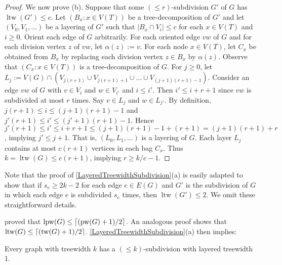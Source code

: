\documentclass[kpfonts]{patmorin}
\DeclareMathOperator{\tw}{tw}
\DeclareMathOperator{\ltw}{ltw}
\DeclareMathOperator{\pw}{pw}
\DeclareMathOperator{\lpw}{lpw}
\begin{document}
\begin{proof}
We now prove (b). Suppose that some $(\leq\!\!r)$-subdivision $G'$ of $G$
has $\ltw(G') \leq c$. Let $(B_x:x\in V(T))$ be a tree-decomposition
of $G'$ and let $(V_0,V_1,\dots)$ be a layering of $G'$ such that
$|B_x\cap V_i| \leq c$ for each $x\in V(T)$ and $i\geq 0$. Orient each
edge of $G$ arbitrarily. For each oriented edge $vw$ of $G$ and for
each division vertex $z$ of $vw$, let $\alpha(z):= v$. For each node
$x\in V(T)$, let $C_x$ be obtained from $B_x$ by replacing each
division vertex $z\in B_x$ by $\alpha(z)$. Observe that $(C_x:x\in
V(T))$ is a tree-decomposition of $G$. For $j\geq 0$, let $L_j:= V(G)
\cap ( V_{j(r+1)}\cup V_{j(r+1)+1} \cup \dots \cup V_{(j+1)(r+1)-1}
)$. Consider an edge $vw$ of $G$ with $v\in V_i$ and $w\in V_{i'}$ and
$i\leq i'$. Then $i' \leq i+ r+1$ since $vw$ is subdivided at most $r$
times. Say $v\in L_j$ and $w\in L_{j'}$. By definition, $j(r+1) \leq i
\leq (j+1)(r+1)-1$ and $j'(r+1) \leq i' \leq (j'+1)(r+1)-1$. Hence
$j'(r+1) \leq i' \leq i+r+1 \leq (j+1)(r+1)-1 + (r+1) = (j+1)(r+1) +
r$, implying $j'\leq j+1$. That is, $(L_0,L_1,\dots)$ is a layering of
$G$. Each layer $L_j$ contains at most $c(r+1)$ vertices in each bag
$C_x$. Thus $k=\ltw(G) \leq c(r+1)$, implying $r \geq k/c -1$.
\end{proof}


Note that the proof of \cref{LayeredTreewidthSubdivision}(a) is easily
adapted to show that if $s_e\geq 2k-2$ for each edge $e\in E(G)$ and
$G'$ is the subdivision of $G$ in which each edge $e$ is subdivided
$s_e$ times, then $\ltw(G')\leq 2$. We omit these straightforward
details.

\citet{bannister.devanny.ea:track} proved that $\lpw(G) \leq \ceil{( \pw(G)+1)/2}$. An analogous proof shows that
$\ltw(G) \leq \ceil{( \tw(G)+1)/2}$.
\cref{LayeredTreewidthSubdivision}(a) then implies:

\begin{cor}\label{treewidth}\label{TreewidthSubdivision}
Every graph with treewidth $k$ has a $(\leq k)$-subdivision with
layered treewidth 1.
\end{cor}
\end{document}
